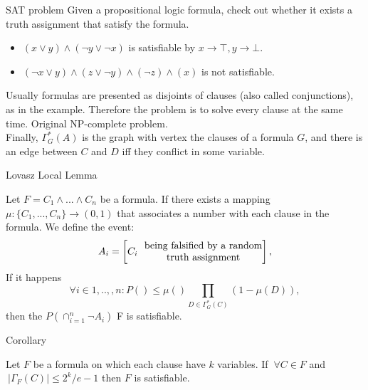 \documentclass{beamer}
\begin{document}
 
\begin{frame}{SAT problem}
  Given a propositional logic formula, check out whether it exists a truth assignment that satisfy the formula.
  \begin{example}   
    \begin{itemize}
    \item $(x\lor y)\land (\neg y \lor  \neg x)$ is satisfiable by $x\to \top, y \to \bot$.
    \item    $(\neg x \lor y)\land (z\lor \neg y) \land (\neg z ) \land (x)$ is not satisfiable.
  \end{itemize}
\end{example}

Usually formulas are presented as disjoints of clauses (also called conjunctions), as in the example. Therefore the problem is to solve every clause at the same time. Original NP-complete problem.\\
Finally, $\Gamma^*_G(A)$ is the graph with vertex the clauses of a formula $G$, and there is an edge between $C$ and $D$ iff they conflict in some variable.
\end{frame}

\begin{frame}{Lovasz Local Lemma}


\begin{theorem}\label{LLLS}
  Let $F = C_1\land ... \land C_n$ be a formula. If there exists a mapping $\mu:\{C_1,...,C_n\}\to (0,1)$ that associates a number with each clause in the formula. We define the event:
  $$A_i = \left[C_i\text{ \stackanchor{ being falsified by a random}{  truth assignment}}\right],$$
	If it happens
	$$
\forall i \in 1,..,,n : P () \le \mu() \prod_{D\in\Gamma^*_G(C)} (1-\mu(D)),
$$
	then the $P(\cap_{i=1}^n \neg A_i)$ F is satisfiable.
\end{theorem}
\end{frame}

\begin{frame}{Corollary}
\begin{corollary}
	Let $F$ be a formula on which each clause have $k$ variables. If  $\ \forall C \in F$ and $\ |\Gamma_F(C)|\le 2^k/e-1$ then $F$ is satisfiable.
      \end{corollary}
      
\end{frame}
\end{document}

